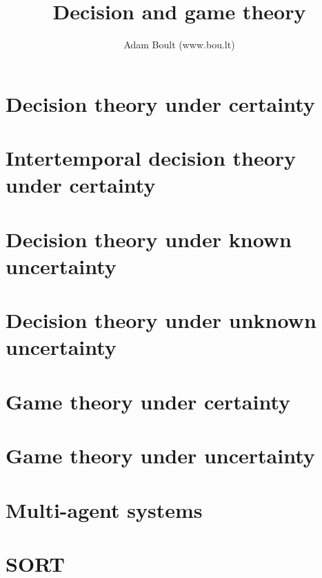\documentclass[oneside]{book}
\begin{document}
\author{Adam Boult (www.bou.lt)}
\title{Decision and game theory}
\maketitle

\setcounter{tocdepth}{0}
\tableofcontents



\part{Decision theory under certainty}




\part{Intertemporal decision theory under certainty}




\part{Decision theory under known uncertainty}



\part{Decision theory under unknown uncertainty}






\part{Game theory under certainty}






\part{Game theory under uncertainty}



\part{Multi-agent systems}

\part{SORT}

\end{document}
